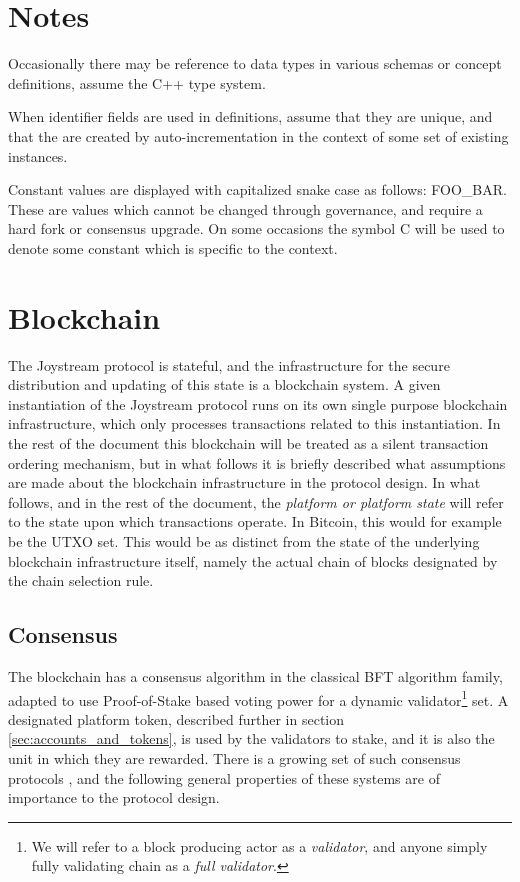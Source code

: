 \documentclass{article}
\begin{document}
\section{Notes}

Occasionally there may be reference to data types in various schemas or concept definitions, assume the C++ type system.

When identifier fields are used in definitions, assume that they are unique, and that the are created by auto-incrementation in the context of some set of existing instances.

Constant values are displayed with capitalized snake case as follows: {\tiny FOO\_BAR}. These are values which cannot be changed through governance, and require a hard fork or consensus upgrade. On some occasions the symbol {\tiny C} will be used to denote some constant which is specific to the context.

\section{Blockchain}

The Joystream protocol is stateful, and the infrastructure for the secure distribution and updating of this state is a blockchain system.
A given instantiation of the Joystream protocol runs on its own single purpose blockchain infrastructure, which only processes transactions related to this instantiation. In the rest of the document this blockchain will be treated as a silent transaction ordering mechanism, but in what follows it is briefly described what assumptions are made about the blockchain infrastructure in the protocol design. In what follows, and in the rest of the document, the \textit{platform or platform state} will refer to the state upon which transactions operate. In Bitcoin, this would for example be the UTXO set. This would be as distinct from the state of the underlying blockchain infrastructure itself, namely the actual chain of blocks designated by the chain selection rule.

\subsection{Consensus}

The blockchain has a consensus algorithm in the classical BFT algorithm family, adapted to use Proof-of-Stake based voting power for a dynamic validator\footnote{We will refer to a block producing actor as a \textit{validator}, and anyone simply fully validating chain as a \textit{full validator}.} set. A designated platform token, described further in section \ref{sec:accounts_and_tokens}, is used by the validators to stake, and it is also the unit in which they are rewarded. There is a growing set of such consensus protocols \cite{tendermint, kiayias2017ouroboros, algorand}, and the following general properties of these systems are of importance to the protocol design.
\end{document}
